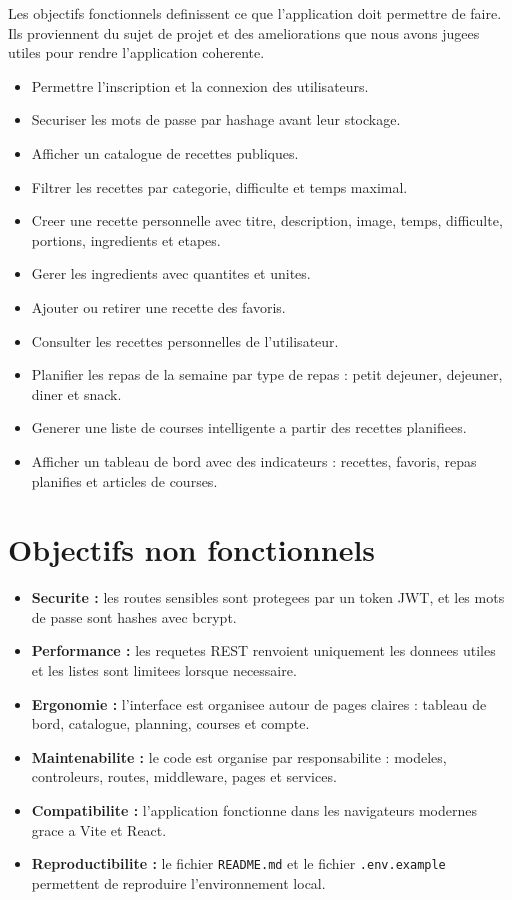 \documentclass[12pt,a4paper]{report}
\begin{document}
Les objectifs fonctionnels definissent ce que l'application doit permettre de faire. Ils proviennent du sujet de projet et des ameliorations que nous avons jugees utiles pour rendre l'application coherente.

\begin{itemize}[leftmargin=*]
  \item Permettre l'inscription et la connexion des utilisateurs.
  \item Securiser les mots de passe par hashage avant leur stockage.
  \item Afficher un catalogue de recettes publiques.
  \item Filtrer les recettes par categorie, difficulte et temps maximal.
  \item Creer une recette personnelle avec titre, description, image, temps, difficulte, portions, ingredients et etapes.
  \item Gerer les ingredients avec quantites et unites.
  \item Ajouter ou retirer une recette des favoris.
  \item Consulter les recettes personnelles de l'utilisateur.
  \item Planifier les repas de la semaine par type de repas : petit dejeuner, dejeuner, diner et snack.
  \item Generer une liste de courses intelligente a partir des recettes planifiees.
  \item Afficher un tableau de bord avec des indicateurs : recettes, favoris, repas planifies et articles de courses.
\end{itemize}

\section{Objectifs non fonctionnels}

\begin{itemize}[leftmargin=*]
  \item \textbf{Securite :} les routes sensibles sont protegees par un token JWT, et les mots de passe sont hashes avec bcrypt.
  \item \textbf{Performance :} les requetes REST renvoient uniquement les donnees utiles et les listes sont limitees lorsque necessaire.
  \item \textbf{Ergonomie :} l'interface est organisee autour de pages claires : tableau de bord, catalogue, planning, courses et compte.
  \item \textbf{Maintenabilite :} le code est organise par responsabilite : modeles, controleurs, routes, middleware, pages et services.
  \item \textbf{Compatibilite :} l'application fonctionne dans les navigateurs modernes grace a Vite et React.
  \item \textbf{Reproductibilite :} le fichier \texttt{README.md} et le fichier \texttt{.env.example} permettent de reproduire l'environnement local.
\end{itemize}
\end{document}

